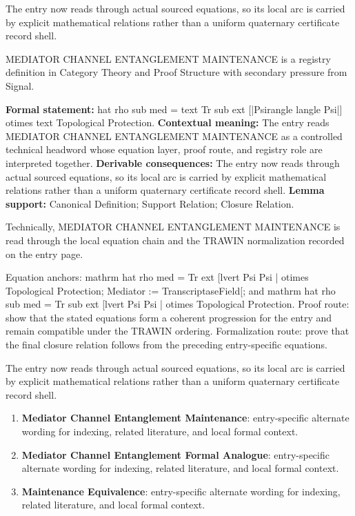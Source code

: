 The entry now reads through actual sourced equations, so its local arc is carried by explicit mathematical relations rather than a uniform quaternary certificate record shell.
\clearpage


\begingroup\small
{}
MEDIATOR CHANNEL ENTANGLEMENT MAINTENANCE is a registry definition in Category Theory and Proof Structure with secondary pressure from Signal.

\begingroup\footnotesize\setlength{\emergencystretch}{3em}\sloppy
\textbf{Formal statement:} hat rho sub med = text Tr sub ext [|Psirangle langle Psi|] otimes text Topological Protection. \textbf{Contextual meaning:} The entry reads MEDIATOR CHANNEL ENTANGLEMENT MAINTENANCE as a controlled technical headword whose equation layer, proof route, and registry role are interpreted together. \textbf{Derivable consequences:} The entry now reads through actual sourced equations, so its local arc is carried by explicit mathematical relations rather than a uniform quaternary certificate record shell. \textbf{Lemma support:} Canonical Definition; Support Relation; Closure Relation.\par
\endgroup

Technically, MEDIATOR CHANNEL ENTANGLEMENT MAINTENANCE is read through the local equation chain and the TRAWIN normalization recorded on the entry page.

Equation anchors: mathrm hat rho med = Tr ext [lvert Psi Psi | otimes Topological Protection; Mediator := TranscriptaseField[; and mathrm hat rho sub med = Tr sub ext [lvert Psi Psi | otimes Topological Protection. Proof route: show that the stated equations form a coherent progression for the entry and remain compatible under the TRAWIN ordering. Formalization route: prove that the final closure relation follows from the preceding entry-specific equations.

The entry now reads through actual sourced equations, so its local arc is carried by explicit mathematical relations rather than a uniform quaternary certificate record shell.
\endgroup

\begin{enumerate}[leftmargin=1.6em,itemsep=6pt,topsep=4pt]
\item \textbf{Mediator Channel Entanglement Maintenance}: entry-specific alternate wording for indexing, related literature, and local formal context.
\item \textbf{Mediator Channel Entanglement Formal Analogue}: entry-specific alternate wording for indexing, related literature, and local formal context.
\item \textbf{Maintenance Equivalence}: entry-specific alternate wording for indexing, related literature, and local formal context.
\end{enumerate}

